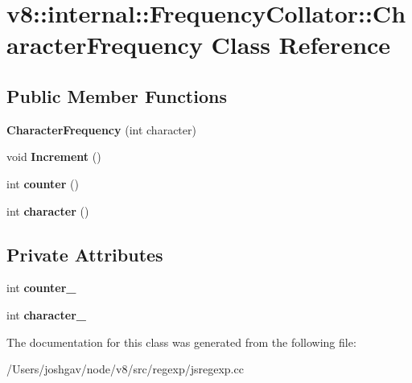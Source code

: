 \hypertarget{classv8_1_1internal_1_1_frequency_collator_1_1_character_frequency}{}\section{v8\+:\+:internal\+:\+:Frequency\+Collator\+:\+:Character\+Frequency Class Reference}
\label{classv8_1_1internal_1_1_frequency_collator_1_1_character_frequency}
\subsection*{Public Member Functions}
\begin{DoxyCompactItemize}
\item 
{\bfseries Character\+Frequency} (int character)\hypertarget{classv8_1_1internal_1_1_frequency_collator_1_1_character_frequency_a6608071896daaa650782829b6123bc3b}{}\label{classv8_1_1internal_1_1_frequency_collator_1_1_character_frequency_a6608071896daaa650782829b6123bc3b}

\item 
void {\bfseries Increment} ()\hypertarget{classv8_1_1internal_1_1_frequency_collator_1_1_character_frequency_a252a146e9fd2b968d128f7ff116b61d7}{}\label{classv8_1_1internal_1_1_frequency_collator_1_1_character_frequency_a252a146e9fd2b968d128f7ff116b61d7}

\item 
int {\bfseries counter} ()\hypertarget{classv8_1_1internal_1_1_frequency_collator_1_1_character_frequency_ae3561209c17581544d850efecd7fa63d}{}\label{classv8_1_1internal_1_1_frequency_collator_1_1_character_frequency_ae3561209c17581544d850efecd7fa63d}

\item 
int {\bfseries character} ()\hypertarget{classv8_1_1internal_1_1_frequency_collator_1_1_character_frequency_a833965b7f5e6ed1aa3241249f41cad39}{}\label{classv8_1_1internal_1_1_frequency_collator_1_1_character_frequency_a833965b7f5e6ed1aa3241249f41cad39}

\end{DoxyCompactItemize}
\subsection*{Private Attributes}
\begin{DoxyCompactItemize}
\item 
int {\bfseries counter\+\_\+}\hypertarget{classv8_1_1internal_1_1_frequency_collator_1_1_character_frequency_af244c8124270aeb964cde33f7a5b0be1}{}\label{classv8_1_1internal_1_1_frequency_collator_1_1_character_frequency_af244c8124270aeb964cde33f7a5b0be1}

\item 
int {\bfseries character\+\_\+}\hypertarget{classv8_1_1internal_1_1_frequency_collator_1_1_character_frequency_a14a2994feaff25b0b9933722fc5d341d}{}\label{classv8_1_1internal_1_1_frequency_collator_1_1_character_frequency_a14a2994feaff25b0b9933722fc5d341d}

\end{DoxyCompactItemize}


The documentation for this class was generated from the following file\+:\begin{DoxyCompactItemize}
\item 
/\+Users/joshgav/node/v8/src/regexp/jsregexp.\+cc\end{DoxyCompactItemize}
